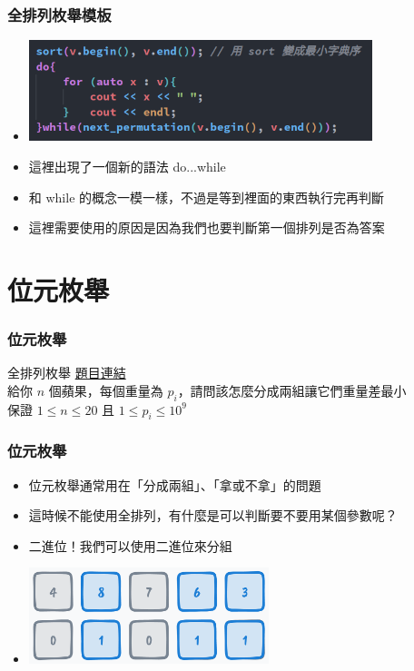 \documentclass{beamer}
\begin{document}
\begin{frame}
    \frametitle{全排列枚舉模板}
    \begin{itemize}
        \item \includegraphics[width=10.0cm]{img/img_2.png}
        \item 這裡出現了一個新的語法 do...while
        \item 和 while 的概念一模一樣，不過是等到裡面的東西執行完再判斷
        \item 這裡需要使用的原因是因為我們也要判斷第一個排列是否為答案
    \end{itemize}
\end{frame}

\section{位元枚舉}

\begin{frame}
    \frametitle{位元枚舉}
    \begin{block}{全排列枚舉}
        \href{https://cses.fi/problemset/task/1623}{題目連結}\\
        給你 $n$ 個蘋果，每個重量為 $p_i$，請問該怎麼分成兩組讓它們重量差最小\\
        保證 $1 \leq n \leq 20$ 且 $1 \leq p_i \leq 10^9$
    \end{block}
\end{frame}

\begin{frame}
    \frametitle{位元枚舉}
    \begin{itemize}
        \item 位元枚舉通常用在「分成兩組」、「拿或不拿」的問題
        \item 這時候不能使用全排列，有什麼是可以判斷要不要用某個參數呢？
        \vspace{0.5cm}
        \item<2-> 二進位！我們可以使用二進位來分組
        \item<2-> \includegraphics[width=7.0cm]{img/img_3.png}
    \end{itemize}
\end{frame}
\end{document}
